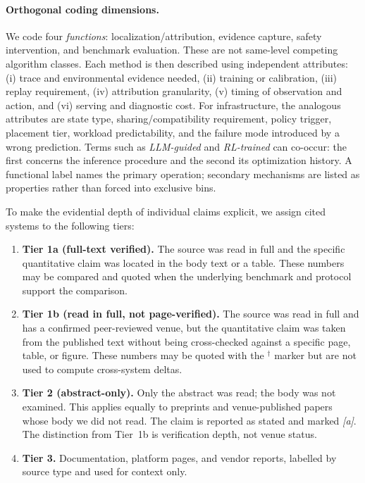 \paragraph*{Orthogonal coding dimensions.} We code four \emph{functions}: localization/attribution, evidence capture, safety intervention, and benchmark evaluation. These are not same-level competing algorithm classes. Each method is then described using independent attributes: (i) trace and environmental evidence needed, (ii) training or calibration, (iii) replay requirement, (iv) attribution granularity, (v) timing of observation and action, and (vi) serving and diagnostic cost. For infrastructure, the analogous attributes are state type, sharing/compatibility requirement, policy trigger, placement tier, workload predictability, and the failure mode introduced by a wrong prediction. Terms such as \emph{LLM-guided} and \emph{RL-trained} can co-occur: the first concerns the inference procedure and the second its optimization history. A functional label names the primary operation; secondary mechanisms are listed as properties rather than forced into exclusive bins.

To make the evidential depth of individual claims explicit, we assign cited systems to the following tiers:

\begin{enumerate}
\item \textbf{Tier 1a (full-text verified).} The source was read in full and the specific quantitative claim was located in the body text or a table. These numbers may be compared and quoted when the underlying benchmark and protocol support the comparison.
\item \textbf{Tier 1b (read in full, not page-verified).} The source was read in full and has a confirmed peer-reviewed venue, but the quantitative claim was taken from the published text without being cross-checked against a specific page, table, or figure. These numbers may be quoted with the $^\dagger$ marker but are not used to compute cross-system deltas.
\item \textbf{Tier 2 (abstract-only).} Only the abstract was read; the body was not examined. This applies equally to preprints and venue-published papers whose body we did not read. The claim is reported as stated and marked \emph{[a]}. The distinction from Tier~1b is verification depth, not venue status.
\item \textbf{Tier 3.} Documentation, platform pages, and vendor reports, labelled by source type and used for context only.
\end{enumerate}

